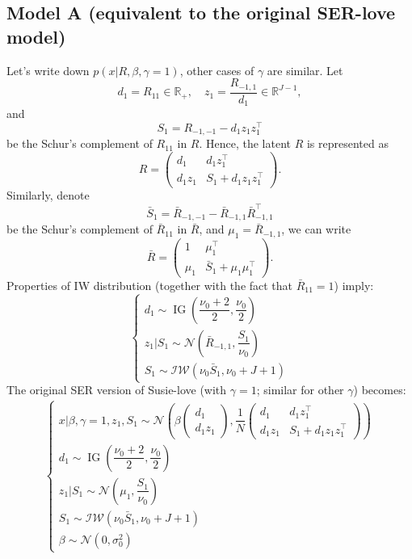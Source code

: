 \documentclass[11pt]{article}
\newcommand{\IG}{\operatorname{IG}}
\begin{document}
\subsection{Model A (equivalent to the original SER-love model)} Let's write down $p(x | R, \beta, \gamma = 1)$, other cases of $\gamma$ are similar. Let 
$$d_1 = R_{11} \in \mathbb{R}_{+}, \quad z_1 = \dfrac{R_{-1, 1}}{d_1} \in \mathbb{R}^{J-1},$$
and 
$$S_1 = R_{-1, -1} - d_1 z_1 z_1^\top $$
be the Schur's complement of $R_{11}$ in $R$. Hence, the latent $R$ is represented as
\begin{equation}\label{eq:R-block}
R = \begin{pmatrix}
d_1 & d_1 z_1^\top \\
d_1 z_1 & S_1 + d_1 z_1 z_1^\top
\end{pmatrix}.
\end{equation}
Similarly, denote
$$\bar S_1 = \bar R_{-1, -1} - \bar R_{-1, 1} \bar R_{-1, 1}^\top $$
be the Schur's complement of $\bar R_{11}$ in $\bar R$, and $\mu_1 =  \bar R_{-1, 1}$, we can write
\begin{equation}\label{eq:R-bar-block}
\bar R = \begin{pmatrix}
1 &\mu_1^\top \\
\mu_1 & \bar S_1 + \mu_1 \mu_1^\top
\end{pmatrix}.
\end{equation}
Properties of IW distribution (together with the fact that $\bar R_{11} = 1$)
imply:
\begin{equation}
\begin{cases}
d_1 \sim \IG\left(\dfrac{\nu_0 + 2}{2}, \dfrac{\nu_0}{2}\right) \\
z_1 | S_1 \sim \mathcal{N}\left(\bar R_{-1, 1}, \dfrac{S_1}{\nu_0}\right)\\
S_1 \sim \mathcal{IW}(\nu_0 \bar S_1, \nu_0 + J + 1)
\end{cases}
\end{equation}
The original SER version of Susie-love (with $\gamma = 1$; similar for other $\gamma$) becomes:
\begin{align}\label{eq:SER-model-A} 
\begin{cases}
x | \beta, \gamma = 1, z_1, S_1 \sim \mathcal{N}\left(\beta 
\begin{pmatrix}
d_1  \\
d_1 z_1
\end{pmatrix}, 
\dfrac{1}{N} \begin{pmatrix}
d_1 & d_1 z_1^\top \\
d_1 z_1 & S_1 + d_1 z_1 z_1^\top
\end{pmatrix}\right)\\
d_1 \sim \IG\left(\dfrac{\nu_0 + 2}{2}, \dfrac{\nu_0}{2}\right) \\
z_1 | S_1 \sim \mathcal{N}\left(\mu_1, \dfrac{S_1}{\nu_0}\right)\\
S_1 \sim \mathcal{IW}(\nu_0 \bar S_1, \nu_0 + J + 1)\\
\beta \sim \mathcal{N}(0, \sigma_0^2)
\end{cases}
\end{align}
\end{document}
